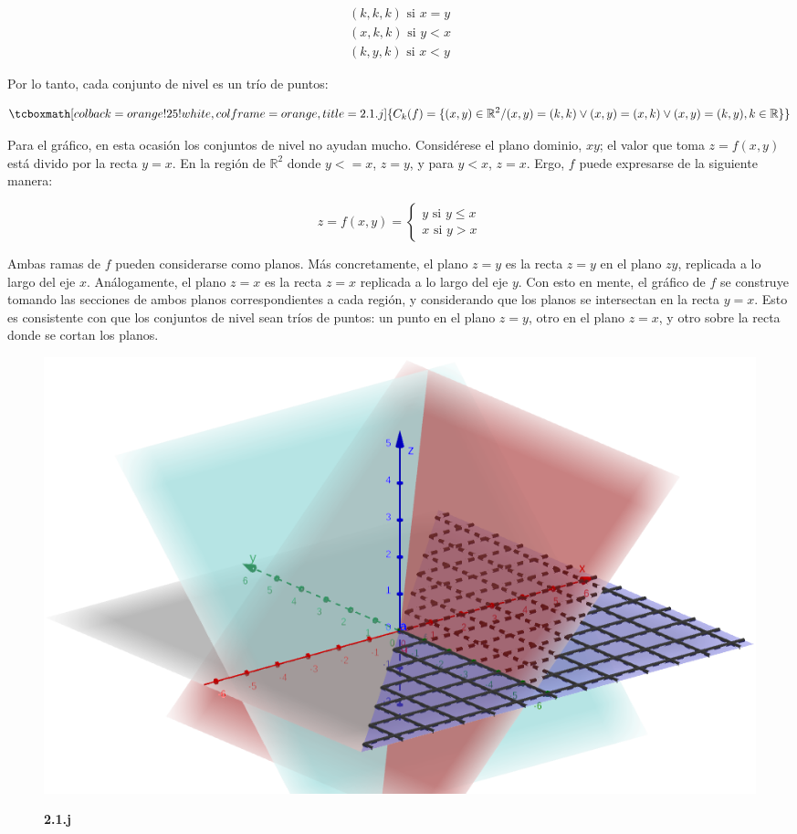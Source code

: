\documentclass{article}
\renewcommand{\Bbb}{\mathbb}
\begin{document}
\begin{equation}
\begin{array}{ll}
(k, k, k) \text{ si } x = y \\
(x, k, k) \text{ si } y < x \\
(k, y, k) \text{ si } x < y
\end{array}
\end{equation}

Por lo tanto, cada conjunto de nivel es un trío de puntos:

\begin{equation}
\tcboxmath[colback=orange!25!white,colframe=orange,title=2.1.j]
{ C_k(f) = \{ (x,y) \in \Bbb R^2 / (x,y)=(k,k) \vee (x,y)=(x,k) \vee (x,y)=(k,y), k \in \Bbb R \} }
\end{equation}

Para el gráfico, en esta ocasión los conjuntos de nivel no ayudan mucho. Considérese el plano dominio, $xy$; el valor que toma $z = f(x,y)$ está divido por la recta $y=x$. En la región de $\Bbb R^2$ donde $y <= x$, $z = y$, y para $y < x$, $z = x$. Ergo, $f$ puede expresarse de la siguiente manera:

\begin{equation}
z = f(x,y) = \left\{ \begin{array}{ll}
y \text{ si } y \leq x \\
x \text{ si } y > x
\end{array} \right.
\end{equation}

Ambas ramas de $f$ pueden considerarse como planos. Más concretamente, el plano $z = y$ es la recta $z = y$ en el plano $zy$, replicada a lo largo del eje $x$. Análogamente, el plano $z = x$ es la recta $z = x$ replicada a lo largo del eje $y$. Con esto en mente, el gráfico de $f$ se construye tomando las secciones de ambos planos correspondientes a cada región, y considerando que los planos se intersectan en la recta $y = x$. Esto es consistente con que los conjuntos de nivel sean tríos de puntos: un punto en el plano $z = y$, otro en el plano $z = x$, y otro sobre la recta donde se cortan los planos.

\begin{figure}[ht]
\caption{\textbf{2.1.j}}
\includegraphics[scale=0.4]{img/ejercicios/2/1-j.png} 
\centering
\label{fig:2-1-j}
\end{figure}
\end{document}
